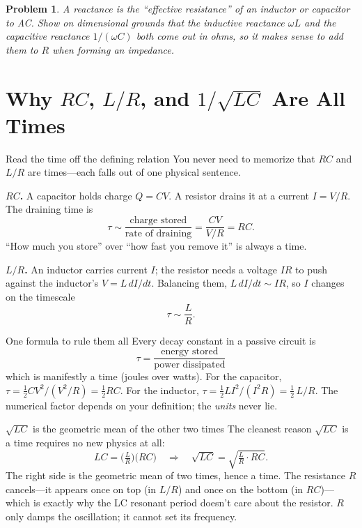 \documentclass[11pt]{article}
\newcommand{\clearpts}{\addtocounter{tpts}{\value{cpts}} \setcounter{cpts}{0}}
\newcommand{\pts}[1]{\clearpts \setcounter{cpts}{#1}}
\theoremstyle{mystyle}
\newtheorem{pproblem}{Problem}
\begin{document}
\pts{4}
\begin{pproblem}
A reactance is the ``effective resistance'' of an inductor or capacitor to AC.
Show on dimensional grounds that the inductive reactance $\omega L$ and the
capacitive reactance $1/(\omega C)$ both come out in ohms, so it makes sense to add
them to $R$ when forming an impedance.
\end{pproblem}

\section{Why \texorpdfstring{$RC$}{RC}, \texorpdfstring{$L/R$}{L/R}, and \texorpdfstring{$1/\sqrt{LC}$}{1/sqrt(LC)} Are All Times}

\begin{psidea}{Read the time off the defining relation}{}
You never need to memorize that $RC$ and $L/R$ are times---each falls out of one
physical sentence.

\textbf{$RC$.} A capacitor holds charge $Q=CV$. A resistor drains it at a current
$I=V/R$. The draining time is
\[
\tau \sim \frac{\text{charge stored}}{\text{rate of draining}}
   = \frac{CV}{V/R}=RC .
\]
``How much you store'' over ``how fast you remove it'' is always a time.

\textbf{$L/R$.} An inductor carries current $I$; the resistor needs a voltage $IR$
to push against the inductor's $V=L\,dI/dt$. Balancing them,
$L\,dI/dt\sim IR$, so $I$ changes on the timescale
\[
\tau \sim \frac{L}{R}.
\]
\end{psidea}

\begin{psidea}{One formula to rule them all}{}
Every decay constant in a passive circuit is
\[
\boxed{\;\tau = \frac{\text{energy stored}}{\text{power dissipated}}\;}
\]
which is manifestly a time (joules over watts). For the capacitor,
$\tau = \tfrac12 CV^2 \big/ (V^2/R) = \tfrac12 RC$. For the inductor,
$\tau = \tfrac12 LI^2 \big/ (I^2R) = \tfrac12\,L/R$. The numerical factor depends on
your definition; the \emph{units} never lie.
\end{psidea}

\begin{psidea}{$\sqrt{LC}$ is the geometric mean of the other two times}{}
The cleanest reason $\sqrt{LC}$ is a time requires no new physics at all:
\[
LC = \Big(\tfrac{L}{R}\Big)\big(RC\big)
\quad\Longrightarrow\quad
\sqrt{LC} = \sqrt{\tfrac{L}{R}\cdot RC}.
\]
The right side is the geometric mean of two times, hence a time. The resistance
$R$ cancels---it appears once on top (in $L/R$) and once on the bottom (in $RC$)---
which is exactly why the LC resonant period doesn't care about the resistor. $R$
only damps the oscillation; it cannot set its frequency.
\end{psidea}
\end{document}
